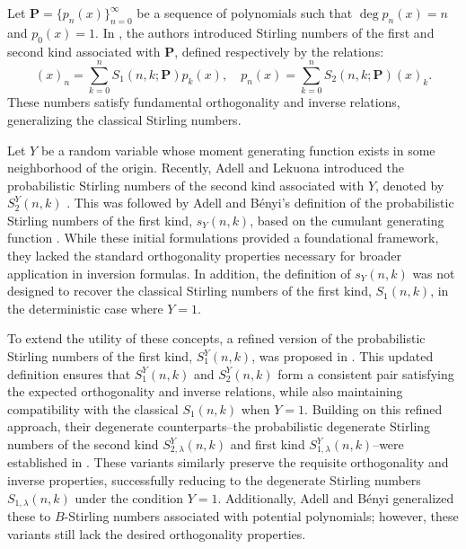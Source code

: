 \documentclass[a4paper,11pt]{amsart}
\begin{document}
Let $\mathbf{P}=\{p_{n}(x)\}_{n=0}^{\infty}$ be a sequence of polynomials such that $\deg p_{n}(x)=n$ and $p_{0}(x)=1$. In \cite{7}, the authors introduced Stirling numbers of the first and second kind associated with $\mathbf{P}$, defined respectively by the relations:
\begin{equation} \label{19-1}
(x)_{n} = \sum_{k=0}^{n}S_{1}(n,k; \mathbf{P})p_{k}(x), \quad
p_{n}(x) = \sum_{k=0}^{n}S_{2}(n,k; \mathbf{P})(x)_{k}.
\end{equation}
These numbers satisfy fundamental orthogonality and inverse relations, generalizing the classical Stirling numbers. \par
Let $Y$ be a random variable whose moment generating function exists in some neighborhood of the origin. Recently, Adell and Lekuona introduced the probabilistic Stirling numbers of the second kind associated with $Y$, denoted by $S_{2}^{Y}(n,k)$ \cite{3}. This was followed by Adell and B\'{e}nyi's definition of the probabilistic Stirling numbers of the first kind, $s_{Y}(n,k)$, based on the cumulant generating function \cite{1}. While these initial formulations provided a foundational framework, they lacked the standard orthogonality properties necessary for broader application in inversion formulas. In addition, the definition of $s_{Y}(n,k)$ was not designed to recover the classical Stirling numbers of the first kind, $S_{1}(n,k)$, in the deterministic case where $Y=1$. \par 
To extend the utility of these concepts, a refined version of the probabilistic Stirling numbers of the first kind, $S_{1}^{Y}(n,k)$, was proposed in \cite{8,28}. This updated definition ensures that $S_{1}^{Y}(n,k)$ and $S_{2}^{Y}(n,k)$ form a consistent pair satisfying the expected orthogonality and inverse relations, while also maintaining compatibility with the classical $S_{1}(n,k)$ when $Y=1$. Building on this refined approach, their degenerate counterparts--the probabilistic degenerate Stirling numbers of the second kind $S_{2,\lambda}^{Y}(n,k)$ and first kind $S_{1,\lambda}^{Y}(n,k)$--were established in \cite{8}. These variants similarly preserve the requisite orthogonality and inverse properties, successfully reducing to the degenerate Stirling numbers $S_{1,\lambda}(n,k)$ under the condition $Y=1$. Additionally, Adell and B\'{e}nyi \cite{2} generalized these to $B$-Stirling numbers associated with potential polynomials; however, these variants still lack the desired orthogonality properties. \par
\end{document}
